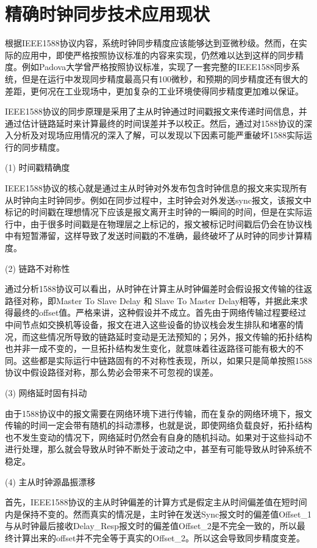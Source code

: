 \section{精确时钟同步技术应用现状}
根据IEEE1588协议内容，系统时钟同步精度应该能够达到亚微秒级\supercite{2}。然而，在实际的应用中，即使严格按照协议标准的内容来实现，仍然难以达到这样的同步精度。例如Padova大学曾严格按照协议标准，实现了一套完整的IEEE1588同步系统\supercite{3}，但是在运行中发现同步精度最高只有100微秒，和预期的同步精度还有很大的差距，更何况在工业现场中，更加复杂的工业环境使得同步精度更加难以保证。

IEEE1588协议的同步原理是采用了主从时钟通过时间戳报文来传递时间信息，并通过估计链路延时来计算最终的时间误差并予以校正。然后，通过对1588协议的深入分析及对现场应用情况的深入了解，可以发现以下因素可能严重破坏1588实际运行的同步精度。

(1) 时间戳精确度

IEEE1588协议的核心就是通过主从时钟对外发布包含时钟信息的报文来实现所有从时钟向主时钟同步。例如在同步过程中，主时钟会对外发送sync报文，该报文中标记的时间戳在理想情况下应该是报文离开主时钟的一瞬间的时间，但是在实际运行中，由于很多时间戳是在物理层之上标记的，报文被标记时间戳后仍会在协议栈中有短暂滞留，这样导致了发送时间戳的不准确，最终破坏了从时钟的同步计算精度\supercite{25}。

(2) 链路不对称性

通过分析1588协议可以看出，从时钟在计算主从时钟偏差时会假设报文传输的往返路径对称，即Master To Slave Delay 和 Slave To Master Delay相等，并据此来求得最终的offset值。严格来讲，这种假设并不成立。首先由于网络传输过程要经过中间节点如交换机等设备，报文在进入这些设备的协议栈会发生排队和堵塞的情况，而这些情况所导致的链路延时变动是无法预知的；另外，报文传输的拓扑结构也并非一成不变的，一旦拓扑结构发生变化，就意味着往返路径可能有极大的不同。这些都是实际运行中链路固有的不对称性表现\supercite{34}，所以，如果只是简单按照1588协议中假设路径对称，那么势必会带来不可忽视的误差。

(3) 网络延时固有抖动

由于1588协议中的报文需要在网络环境下进行传输，而在复杂的网络环境下，报文传输的时间一定会带有随机的抖动漂移，也就是说，即使网络负载良好，拓扑结构也不发生变动的情况下，网络延时仍然会有自身的随机抖动。如果对于这些抖动不进行处理，那么就会导致从时钟不断处于波动之中，甚至有可能导致从时钟系统不稳定。

(4) 主从时钟源晶振漂移

首先，IEEE1588协议的主从时钟偏差的计算方式是假定主从时间偏差值在短时间内是保持不变的。然而真实的情况是，主时钟在发送Sync报文时的偏差值Offset\_1与从时钟最后接收Delay\_Resp报文时的偏差值Offset\_2是不完全一致的，所以最终计算出来的offset并不完全等于真实的Offset\_2\supercite{4}。所以这会导致同步精度变差。

